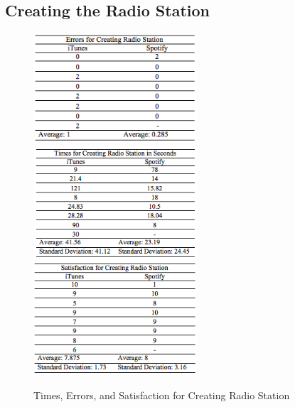 \documentclass[11pt]{article}
\begin{document}
\subsection{Creating the Radio Station}

\begin{figure}[H] %
   \centering
   \includegraphics[width=2.4in]{errors_radio.png}       
   \includegraphics[width=2.4in]{times_radio.png} 
   \includegraphics[width=2.4in]{satisfaction_radio.png}    
   \caption{Times, Errors, and Satisfaction for Creating Radio Station}
   \label{fig:radio}
\end{figure}
\end{document}
